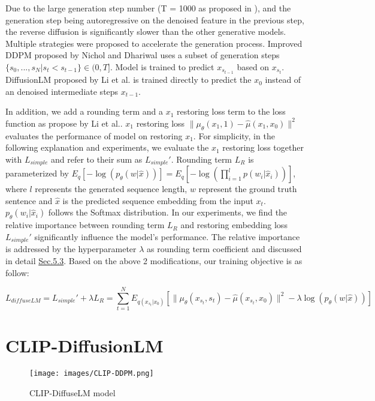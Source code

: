 \documentclass{article}
\begin{document}
Due to the large generation step number (T = 1000 as proposed in \cite{ddpm}), and the generation step being autoregressive on the denoised feature in the previous step, the reverse diffusion is significantly slower than the other generative models\cite{gan, vae}. Multiple strategies were proposed to accelerate the generation process. Improved DDPM proposed by Nichol and Dhariwal\cite{improved-ddpm} uses a subset of generation steps $\{s_0, ..., s_N | s_t < s_{t-1}\} \in (0, T]$. Model is trained to predict $x_{s_{t-1}}$ based on $x_{s_t}$. DiffusionLM proposed by Li et al.\cite{diffuselm} is trained directly to predict the $x_0$ instead of an denoised intermediate steps $x_{t-1}$.

In addition, we add a rounding term and a $x_1$ restoring loss term to the loss function as propose by Li et al.\cite{diffuselm}. $x_1$ restoring loss $\|\mu_{\theta}(x_1, 1) - \hat{\mu}(x_1, x_0)\|^2$ evaluates the performance of model on restoring $x_1$. For simplicity, in the following explanation and experiments, we evaluate the $x_1$ restoring loss together with $L_{simple}$ and refer to their sum as $L_{simple}'$. Rounding term $L_R$ is parameterized by $E_q[-\log(p_{\theta}(w | \hat{x}))] = E_q[-\log(\prod_{i=1}^l p(w_i | \hat{x}_i))]$, where $l$ represents the generated sequence length, $w$ represent the ground truth sentence and $\hat{x}$ is the predicted sequence embedding from the input $x_t$. $p_{\theta}(w_i | \hat{x}_i)$ follows the Softmax distribution. In our experiments, we find the relative importance between rounding term $L_R$ and restoring embedding loss $L_{simple}'$ significantly influence the model's performance. The relative importance is addressed by the hyperparameter $\lambda$ as rounding term coefficient and discussed in detail \hyperref[sec:lambda-exp]{Sec.5.3}. Based on the above 2 modifications, our training objective is as follow:

$$L_{diffuseLM} = L_{simple}' + \lambda L_R = \sum_{t=1}^{N} E_{q(x_{s_t} | x_0)} [\|\mu_{\theta}(x_{s_t}, s_t) - \hat{\mu}(x_{s_t}, x_0)\|^2 -\lambda\log(p_{\theta}(w | \hat{x}))]$$


\section{CLIP-DiffusionLM}
\label{sec:CLIP-DiffuseLM}
\begin{figure}
    \centering
    \texttt{[image: images/CLIP-DDPM.png]}
    \caption{CLIP-DiffuseLM model}
    \label{fig:model}
\end{figure}
\end{document}
